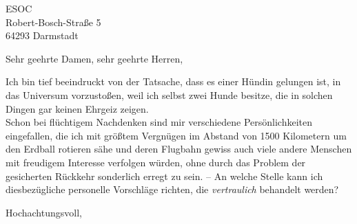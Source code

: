 \documentclass[a4paper]{letter}
\begin{document}
\address{IONOS SE \\ Hinterm Hauptbahnhof 5 \\ 76137 Karlsruhe}
\begin{letter}{ESOC \\ Robert-Bosch-Straße 5 \\ 64293 Darmstadt}
\signature{\texttt{[image: demos/loriot.jpg]} \\ Loriot (Vicco von Bülow)}
\opening{Sehr geehrte Damen, sehr geehrte Herren,}

Ich bin tief beeindruckt von der Tatsache, dass es einer Hündin gelungen ist, in das Universum vorzustoßen, weil ich selbst zwei Hunde besitze, die in solchen Dingen gar keinen Ehrgeiz zeigen.  \\
Schon bei flüchtigem Nachdenken sind mir verschiedene Persönlichkeiten eingefallen, die ich mit größtem Vergnügen im Abstand von 1500 Kilometern um den Erdball rotieren sähe und deren Flugbahn gewiss auch viele andere Menschen mit freudigem Interesse verfolgen würden, ohne durch das Problem der gesicherten Rückkehr sonderlich erregt zu sein. – An welche Stelle kann ich diesbezügliche personelle Vorschläge richten, die \emph{vertraulich} behandelt werden?

\closing{Hochachtungsvoll,}
\end{letter}
\end{document}
